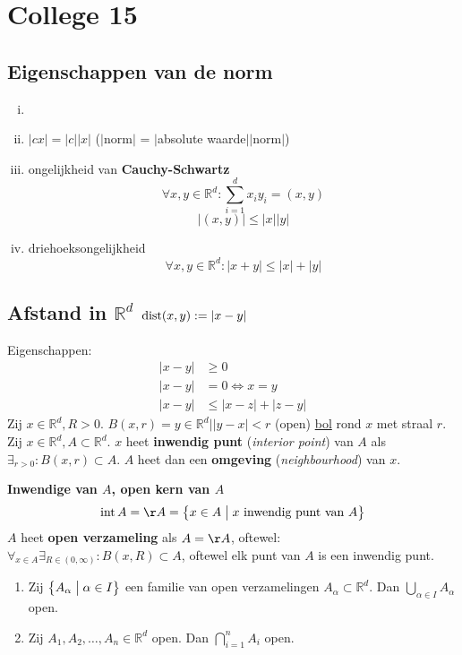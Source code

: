 \documentclass{2wa40summary}
\begin{document}
	\maketitle
	\thispagestyle{empty}
	\newpage
	
\section{College 15}
    \subsection{Eigenschappen van de norm}
    \begin{enumerate}[(i)]
      \item {}
      \item $|cx|=|c||x|$ ($|$norm$|$ = $|$absolute waarde$||$norm$|$)
      \item ongelijkheid van \textbf{Cauchy-Schwartz}
        \[\forall x,y \in \mathbb{R}^d: \sum_{i=1}^{d}x_i y_i = (x,y)\]
        \[|(x,y)| \leq |x||y|\]
      \item driehoeksongelijkheid
        \[\forall x,y \in \mathbb{R}^d: |x+y|\leq |x|+|y|\]
    \end{enumerate}
    \subsection{Afstand in $\mathbb{R}^d$ $\operatorname{\mathop{dist}}(x,y):=|x-y|$}
        Eigenschappen:
            \begin{align*}
              |x-y| & \geq 0 \\
              |x-y| & =0 \Leftrightarrow x=y \\
              |x-y| & \leq |x-z| + |z-y|
            \end{align*}
         Zij $x \in \mathbb{R}^d, R>0$.
              $B(x,r)={y \in \mathbb{R}^d | |y-x|<r }$ (open) \underline{bol} rond $x$ met straal $r$.
		 Zij $x \in \mathbb{R}^d, A \subset \mathbb{R}^d$. $x$ heet \textbf{inwendig punt} (\textit{interior point}) van $A$ als $\exists _{r>0}:B(x,r) \subset A$. $A$ heet dan een \textbf{omgeving} (\textit{neighbourhood}) van $x$.

              \textbf{Inwendige van $A$, open kern van $A$}
              \[\intr A=\AA=\big\{x \in A \bigm| x \text{ inwendig punt van } A\big\}\]
              $A$ heet \textbf{open verzameling} als $A=\AA$, oftewel: $\forall _{x \in A} \exists _{R \in (0,\infty)}: B(x,R) \subset A$, oftewel elk punt van $A$ is een inwendig punt.
        \theorem
          \begin{enumerate}[(1)]
                \item Zij $\big\{A_\alpha \bigm| \alpha \in I \big\}$ een familie van open verzamelingen $A_\alpha \subset \mathbb{R}^d$. Dan $\bigcup_{\alpha \in I}A_\alpha$ open.
                \item Zij $A_1,A_2,\dots,A_n \in \mathbb{R}^d$ open. Dan $\bigcap_{i=1}^{n}A_i$ open.
          \end{enumerate}
\end{document}
